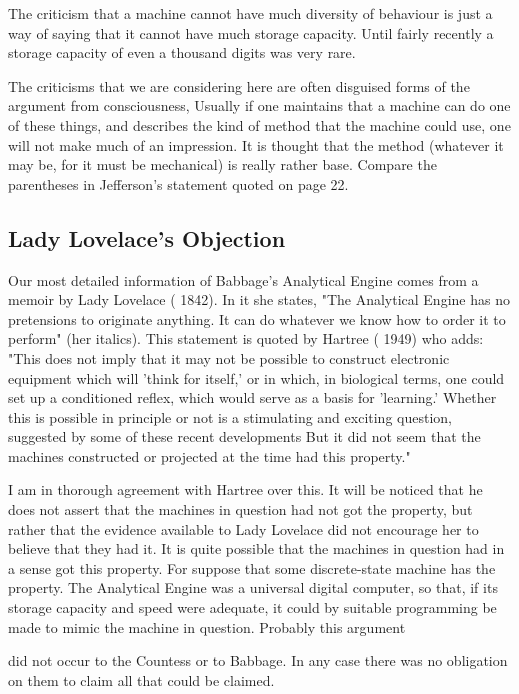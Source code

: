 \documentclass{article}
\begin{document}
The criticism that a machine cannot have much diversity of behaviour is just a way of saying that it cannot have much storage capacity. Until fairly recently a storage capacity of even a thousand digits was very rare.

The criticisms that we are considering here are often disguised forms of the argument from consciousness, Usually if one maintains that a machine can do one of these things, and describes the kind of method that the machine could use, one will not make much of an impression. It is thought that the method (whatever it may be, for it must be mechanical) is really rather base. Compare the parentheses in Jefferson's statement quoted on page 22.


\subsection{Lady Lovelace's Objection}

Our most detailed information of Babbage's Analytical Engine comes from a memoir by Lady Lovelace ( 1842). In it she states, "The Analytical Engine has no pretensions to originate anything. It can do whatever we know how to order it to perform" (her italics). This statement is quoted by Hartree ( 1949) who adds: "This does not imply that it may not be possible to construct electronic equipment which will 'think for itself,' or in which, in biological terms, one could set up a conditioned reflex, which would serve as a basis for 'learning.' Whether this is possible in principle or not is a stimulating and exciting question, suggested by some of these recent developments But it did not seem that the machines constructed or projected at the time had this property."

I am in thorough agreement with Hartree over this. It will be noticed that he does not assert that the machines in question had not got the property, but rather that the evidence available to Lady Lovelace did not encourage her to believe that they had it. It is quite possible that the machines in question had in a sense got this property. For suppose that some discrete-state machine has the property. The Analytical Engine was a universal digital computer, so that, if its storage capacity and speed were adequate, it could by suitable programming be made to mimic the machine in question. Probably this argument

did not occur to the Countess or to Babbage. In any case there was no obligation on them to claim all that could be claimed.
\end{document}
